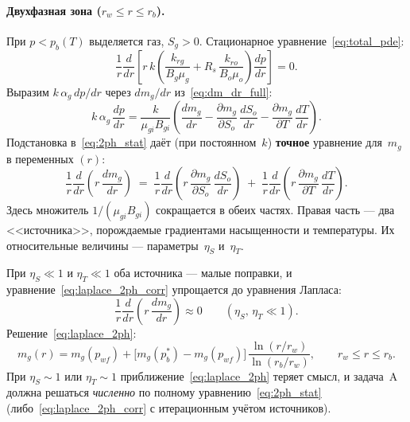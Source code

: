 ﻿\documentclass[12pt,a4paper]{article}
\begin{document}
\paragraph{Двухфазная зона ($r_w \leqslant r \leqslant r_b$).}
При $p < p_b(T)$ выделяется газ, $S_g > 0$.
Стационарное уравнение~\eqref{eq:total_pde}:
\begin{equation}\label{eq:2ph_stat}
  \frac{1}{r}\frac{d}{dr}\left[r\,k\left(
  \frac{k_{rg}}{B_g\mu_g}
  + R_s\,\frac{k_{ro}}{B_o\mu_o}\right)
  \frac{dp}{dr}\right] = 0.
\end{equation}
Выразим $k\,\alpha_g\,dp/dr$ через $dm_g/dr$
из~\eqref{eq:dm_dr_full}:
\begin{equation}\label{eq:alpha_dp_via_dm}
  k\,\alpha_g\,\frac{dp}{dr}
  = \frac{k}{\mu_{gi}B_{gi}}\!\left(\frac{dm_g}{dr}
  - \frac{\partial m_g}{\partial S_o}\,\frac{dS_o}{dr}
  - \frac{\partial m_g}{\partial T}\,\frac{dT}{dr}\right).
\end{equation}
Подстановка в~\eqref{eq:2ph_stat} даёт
(при постоянном~$k$) \textbf{точное} уравнение
для~$m_g$ в переменных $(r)$:
\begin{equation}\label{eq:laplace_2ph_corr}
  \boxed{\;
  \frac{1}{r}\frac{d}{dr}\!\left(r\,\frac{dm_g}{dr}\right)
  \;=\;\frac{1}{r}\frac{d}{dr}\!\left(
    r\,\frac{\partial m_g}{\partial S_o}\,\frac{dS_o}{dr}\right)
  \;+\;\frac{1}{r}\frac{d}{dr}\!\left(
    r\,\frac{\partial m_g}{\partial T}\,\frac{dT}{dr}
    \right).\;}
\end{equation}
Здесь множитель $1/(\mu_{gi}B_{gi})$ сокращается
в обеих частях. Правая часть --- два <<источника>>,
порождаемые градиентами насыщенности и температуры.
Их относительные величины --- параметры~$\eta_S$ и~$\eta_T$.

При $\eta_S \ll 1$ и $\eta_T \ll 1$ оба источника ---
малые поправки, и уравнение~\eqref{eq:laplace_2ph_corr}
упрощается до уравнения Лапласа:
\begin{equation}\label{eq:laplace_2ph}
  \frac{1}{r}\frac{d}{dr}\left(r\,\frac{dm_g}{dr}\right)
  \approx 0
  \qquad (\eta_S,\,\eta_T \ll 1).
\end{equation}
Решение~\eqref{eq:laplace_2ph}:
\begin{equation}\label{eq:mo_2ph_sol}
  m_g(r) = m_g(p_{wf})
  + \bigl[m_g(p_b^*) - m_g(p_{wf})\bigr]\,
  \frac{\ln(r/r_w)}{\ln(r_b/r_w)},
  \qquad r_w \leqslant r \leqslant r_b.
\end{equation}
При $\eta_S \sim 1$ или $\eta_T \sim 1$
приближение~\eqref{eq:laplace_2ph} теряет смысл,
и задача~A должна решаться \emph{численно}
по полному уравнению~\eqref{eq:2ph_stat}
(либо~\eqref{eq:laplace_2ph_corr} с итерационным
учётом источников).
\end{document}
